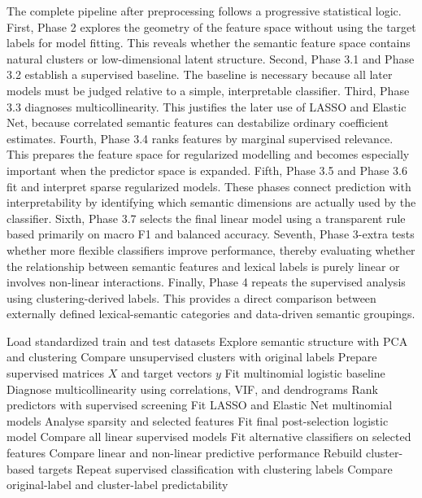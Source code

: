 \documentclass{ipgpmaster}
\begin{document}
The complete pipeline after preprocessing follows a progressive statistical logic.
First, Phase 2 explores the geometry of the feature space without using the target labels for model fitting. This reveals whether the semantic feature space contains natural clusters or low-dimensional latent structure.
Second, Phase 3.1 and Phase 3.2 establish a supervised baseline. The baseline is necessary because all later models must be judged relative to a simple, interpretable classifier.
Third, Phase 3.3 diagnoses multicollinearity. This justifies the later use of LASSO and Elastic Net, because correlated semantic features can destabilize ordinary coefficient estimates.
Fourth, Phase 3.4 ranks features by marginal supervised relevance. This prepares the feature space for regularized modelling and becomes especially important when the predictor space is expanded.
Fifth, Phase 3.5 and Phase 3.6 fit and interpret sparse regularized models. These phases connect prediction with interpretability by identifying which semantic dimensions are actually used by the classifier.
Sixth, Phase 3.7 selects the final linear model using a transparent rule based primarily on macro F1 and balanced accuracy.
Seventh, Phase 3-extra tests whether more flexible classifiers improve performance, thereby evaluating whether the relationship between semantic features and lexical labels is purely linear or involves non-linear interactions.
Finally, Phase 4 repeats the supervised analysis using clustering-derived labels. This provides a direct comparison between externally defined lexical-semantic categories and data-driven semantic groupings.

\begin{algorithm}[H]
\caption{Complete analysis workflow after preprocessing}
\begin{algorithmic}[1]
\State Load standardized train and test datasets
\State Explore semantic structure with PCA and clustering
\State Compare unsupervised clusters with original labels
\State Prepare supervised matrices \(X\) and target vectors \(y\)
\State Fit multinomial logistic baseline
\State Diagnose multicollinearity using correlations, VIF, and dendrograms
\State Rank predictors with supervised screening
\State Fit LASSO and Elastic Net multinomial models
\State Analyse sparsity and selected features
\State Fit final post-selection logistic model
\State Compare all linear supervised models
\State Fit alternative classifiers on selected features
\State Compare linear and non-linear predictive performance
\State Rebuild cluster-based targets
\State Repeat supervised classification with clustering labels
\State Compare original-label and cluster-label predictability
\end{algorithmic}
\end{algorithm}


\cleardoublepage
\end{document}
